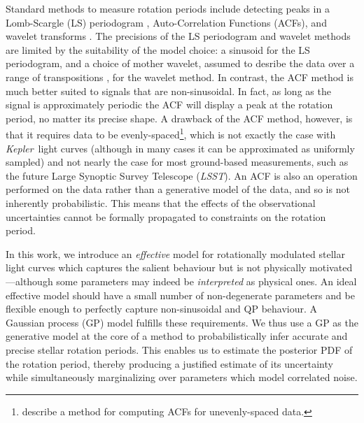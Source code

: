 \documentclass[useAMS, usenatbib, preprint, 12pt]{aastex}
\newcommand{\Kepler}{{\it Kepler}}
\newcommand{\LSST}{{\it LSST}}
\newcommand{\eg}{{\it e.g.}}
\begin{document}
Standard methods to measure rotation periods include detecting
peaks in a Lomb-Scargle \citep{Lomb1976, Scargle1982} (LS) periodogram
\citep[e.g.][]{Reinhold2013}, Auto-Correlation Functions (ACFs),
\citep{Mcquillan2013} and wavelet transforms \citep{Garcia2014}.
The precisions of the LS periodogram and wavelet methods are limited by the
suitability of the model choice: a sinusoid for the LS periodogram,
and a choice of mother wavelet, assumed to desribe the data
over a range of transpositions \citep[see, \eg][]{Carter2010},
for the wavelet method.
In contrast, the ACF method is much better suited to signals that are
non-sinusoidal.
In fact, as long as the signal is approximately periodic the ACF will
display a peak at the rotation period, no matter its precise shape.
A drawback of the ACF method, however, is that it requires data to be
evenly-spaced\footnote{\citet{Edelson1988} describe a method for computing
ACFs for unevenly-spaced data.}, which is not exactly the case with \Kepler\
light curves (although in many cases it can be approximated as uniformly
sampled) and not nearly the case for most ground-based measurements, such
as the future Large Synoptic Survey Telescope (\LSST).
An ACF is also an operation performed on the data rather than a generative
model of the data, and so is not inherently probabilistic.
This means that the effects of the observational uncertainties cannot be
formally propagated to constraints on the rotation period.

In this work, we introduce an {\it effective} model for rotationally
modulated stellar light curves
which captures the salient behaviour but is not
physically motivated---although some parameters may indeed be
{\it interpreted} as physical ones.
An ideal effective model should have a small number of non-degenerate parameters
and be flexible enough to perfectly capture non-sinusoidal and QP behaviour.
A Gaussian process (GP) model fulfills these requirements. We thus use a GP
as the generative model at the core of a method to probabilistically
infer accurate and precise stellar rotation periods.  This enables us to
estimate the posterior PDF of the rotation period, thereby producing a
justified estimate of its uncertainty while simultaneously marginalizing over
parameters which model correlated noise.
\end{document}
